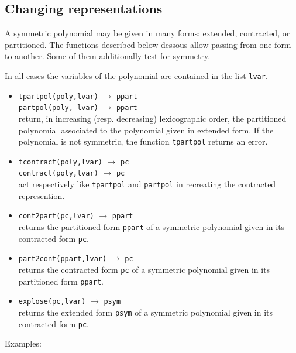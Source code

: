 \documentclass[11pt]{article}
\begin{document}
\subsection{Changing representations}

A symmetric polynomial may be given in many forms: extended, contracted, or
partitioned. The functions described below-dessous allow passing from one form
to another. Some of them additionally test for symmetry.

In all cases the variables of the polynomial are contained in the list
\texttt{lvar}.
\begin{itemize}
   \item \texttt{tpartpol(poly,lvar)} 
   $\longrightarrow$ \texttt{ppart} \\ 
   \texttt{partpol(poly, lvar)} 
   $\longrightarrow$ \texttt{ppart} \\ 
   return, in increasing (resp. decreasing) lexicographic order, the partitioned
   polynomial associated to the polynomial given in extended form.  If the
   polynomial is not symmetric, the function \texttt{tpartpol} returns an error.
  \item \texttt{tcontract(poly,lvar)} 
    $\longrightarrow$ \texttt{pc} \\ \texttt{contract(poly,lvar)}
     $\longrightarrow$ \texttt{pc} \\ act respectively
    like \texttt{tpartpol} and \texttt{partpol} in recreating the contracted
    represention.
  \item \texttt{cont2part(pc,lvar)} 
    $\longrightarrow$ \texttt{ppart} \\ returns the partitioned form
    \texttt{ppart} of a symmetric polynomial given in its contracted form
    \texttt{pc}.
  \item \texttt{part2cont(ppart,lvar)} 
    $\longrightarrow$ \texttt{pc} \\ returns the contracted form \texttt{pc} of a
    symmetric polynomial given in its partitioned form \texttt{ppart}.
  \item \texttt{explose(pc,lvar)}  $\longrightarrow$
    \texttt{psym} \\ returns the extended form \texttt{psym} of a symmetric
    polynomial given in its contracted form \texttt{pc}.
\end{itemize}
Examples:
\small
\end{document}
